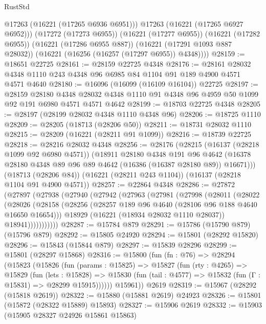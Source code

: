 \begin{lexlean}{RustStd}
\begin{coremodule}
            @17263
            (@16221 (@17265 @6936 @6951)))
          @17263
          (@16221 (@17265 @6927 @6952)))
        (@17272 (@17273 @6955))
        (@16221 (@17277 @6955))
        (@16221 (@17282 @6955))
        (@16221 (@17286 @6955 @887))
        (@16221 (@17291 @1093 @887 @28032))
        (@16221 (@16256 (@16257 (@17297 @6955)) @4348))))
@28159 := @18651 @22725
@28161 := @28159 @22725 @4348
@28176 := @28161 @28032 @4348 @1110 @243 @4348 @96 @6985 @84 @1104 @91 @189 @4900 @4571 @4571 @4640
@28180 := @16096 (@16099 (@16109 @16104)) @22725
@28197 := @28159
    @28180
    @4348
    @28032
    @4348
    @1110
    @91
    @4348
    @96
    @4959
    @50
    @1099
    @92
    @191
    @6980
    @4571
    @4571
    @4642
@28199 := @18703 @22725 @4348
@28205 := @28197 (@28199 @28032 @4348 @1110 @4348 @96)
@28206 := @18725 @1110
@28209 := @28205 (@18713 (@28206 @50))
@28211 := @18731 @28032 @1110
@28215 := @28209 (@16221 (@28211 @91 @1099))
@28216 := @18739 @22725
@28218 := @28216 @28032 @4348
@28256 := @28176
    (@28215
      (@16137 (@28218 @1099 @92 @6980 @4571))
      (@18911
        @28180
        @4348
        @191
        @96
        @4642
        (@16378 @28180 @4348 @89 @96 @89 @4642 (@16386 (@16387 @28180 @89)) @16671)))
    (@18713 (@28206 @84))
    (@16221 (@28211 @243 @1104))
    (@16137 (@28218 @1104 @91 @4900 @4571))
@28257 := @22864 @4348
@28286 := @27872
    (@27897
      (@27938
        (@27940
          (@27942
            (@27963
              (@27981
                (@27998
                  (@28011
                    (@28022
                      (@28026
                        (@28158
                          (@28256 (@28257 @189 @96 @4640 (@28106 @96 @188 @4640 @16650 @16654)))
                          @18929
                          (@16221 (@18934 @28032 @1110 @28037))
                          @18941)))))))))))
@28287 := @15784 @879
@28291 := @15786 (@15790 @879) (@15796 @879)
@28292 := @15805 @24920
@28294 := @15801 (@28292 @15820)
@28296 := @15843 (@15844 @879)
@28297 := @15839 @28296
@28299 := @15801 (@28297 @15868)
@28316 := @15800
    (fun (fn : @76) =>
    @28294
      (@15823
        (@15826
          (fun (params : @15825) =>
          @15827
            (fun (rty : @4265) =>
            @15829
              (fun (lets : @15828) =>
              @15830 (fun (tail : @4577) => @15832 (fun (Γ : @15831) => @28299 @15915))))))
        @15961))
    @2619
@28319 := @15967 (@28292 (@15818 @2619))
@28322 := @15880 (@15881 @2619) @24923
@28326 := @15801 (@15872 (@28322 @15889) @15893)
@28327 := @15906 @2619
@28332 := @15903 (@15905 @28327 @24926 @15861 @15863)

\end{coremodule}
\end{lexlean}
